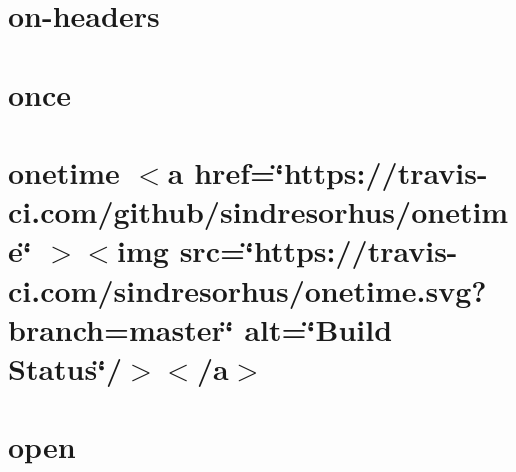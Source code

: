 \documentclass[twoside]{book}
\newcommand{\+}{\discretionary{\mbox{\scriptsize$\hookleftarrow$}}{}{}}
\begin{document}
\chapter{on-\/headers}
\label{md__c___users_vaishnavi_jadhav__desktop__developer_code_mean_stack_example_client_node_modules_on_headers__r_e_a_d_m_e}

\chapter{once}
\label{md__c___users_vaishnavi_jadhav__desktop__developer_code_mean_stack_example_client_node_modules_once__r_e_a_d_m_e}

\chapter{onetime \texorpdfstring{$<$}{<}a href=\char`\"{}https\+://travis-\/ci.\+com/github/sindresorhus/onetime\char`\"{} \texorpdfstring{$>$}{>}\texorpdfstring{$<$}{<}img src=\char`\"{}https\+://travis-\/ci.\+com/sindresorhus/onetime.\+svg?branch=master\char`\"{} alt=\char`\"{}\+Build Status\char`\"{}/\texorpdfstring{$>$}{>}\texorpdfstring{$<$}{<}/a\texorpdfstring{$>$}{>}}
\label{md__c___users_vaishnavi_jadhav__desktop__developer_code_mean_stack_example_client_node_modules_onetime_readme}

\chapter{open}
\label{md__c___users_vaishnavi_jadhav__desktop__developer_code_mean_stack_example_client_node_modules_open_readme}

\end{document}
